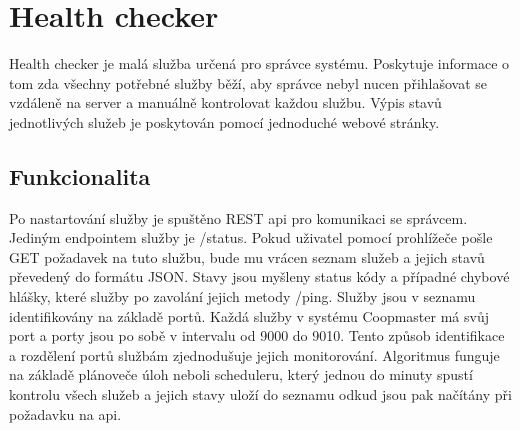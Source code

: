 \section{Health checker}\label{sec:health-checker}
Health checker je malá služba určená pro správce systému.
Poskytuje informace o tom zda všechny potřebné služby běží, aby správce nebyl nucen přihlašovat se vzdáleně na server a manuálně kontrolovat každou službu.
Výpis stavů jednotlivých služeb je poskytován pomocí jednoduché webové stránky.

\subsection*{Funkcionalita}
Po nastartování služby je spuštěno REST api pro komunikaci se správcem.
Jediným endpointem služby je /status.
Pokud uživatel pomocí prohlížeče pošle GET požadavek na tuto službu, bude mu vrácen seznam služeb a jejich stavů převedený do formátu JSON.
Stavy jsou myšleny status kódy a případné chybové hlášky, které služby po zavolání jejich metody /ping.
Služby jsou v seznamu identifikovány na základě portů.
Každá služby v systému Coopmaster má svůj port a porty jsou po sobě v intervalu od 9000 do 9010.
Tento způsob identifikace a rozdělení portů službám zjednodušuje jejich monitorování.
Algoritmus funguje na základě plánoveče úloh neboli scheduleru, který jednou do minuty spustí kontrolu všech služeb a jejich stavy uloží do seznamu odkud jsou pak načítány při požadavku na api.

